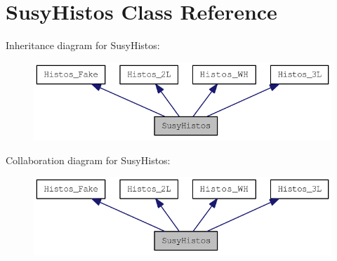\hypertarget{classSusyHistos}{
\section{SusyHistos Class Reference}
\label{classSusyHistos}
}
Inheritance diagram for SusyHistos:\nopagebreak
\begin{figure}[H]
\begin{center}
\leavevmode
\includegraphics[width=372pt]{classSusyHistos__inherit__graph}
\end{center}
\end{figure}
Collaboration diagram for SusyHistos:\nopagebreak
\begin{figure}[H]
\begin{center}
\leavevmode
\includegraphics[width=372pt]{classSusyHistos__coll__graph}
\end{center}
\end{figure}
